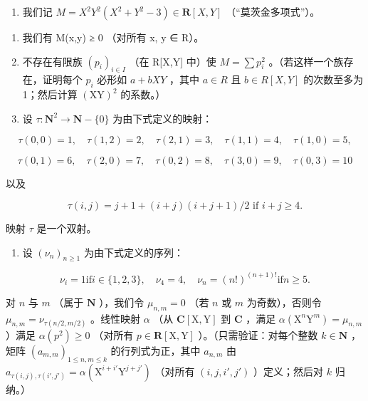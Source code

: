 \begin{enumerate}
\def\labelenumi{\arabic{enumi})}
\setcounter{enumi}{26}
\tightlist
\item
  我们记 \(M = X^{2}Y^{2}(X^{2} + Y^{2} - 3) \in \mathbf{R}[X, Y]\) （“莫茨金多项式”）。
\end{enumerate}

\begin{enumerate}
\def\labelenumi{\alph{enumi})}
\item
  我们有 M(x,y) ≥ 0 （对所有 x, y ∈ R）。
\item
  不存在有限族 \((p_{i})_{i\in I}\) （在 R{[}X,Y{]} 中）使 \(M=\sum p_{i}^{2}\) 。（若这样一个族存在，证明每个 \(p_{i}\) 必形如 \(a+bXY\) ，其中 \(a\in R\) 且 \(b\in R[X,Y]\) 的次数至多为 1；然后计算 \((\mathrm{XY})^{2}\) 的系数。）
\item
  设 \(\tau\colon\mathbf{N}^{2}\to\mathbf{N}-\{0\}\) 为由下式定义的映射：
\end{enumerate}

\[
\tau (0, 0) = 1, \quad \tau (1, 2) = 2, \quad \tau (2, 1) = 3, \quad \tau (1, 1) = 4, \quad \tau (1, 0) = 5,
\]

\[
\tau (0, 1) = 6, \quad \tau (2, 0) = 7, \quad \tau (0, 2) = 8, \quad \tau (3, 0) = 9, \quad \tau (0, 3) = 1 0
\]

以及

\[
\tau (i, j) = j + 1 + (i + j) (i + j + 1) / 2 \text {   if   } i + j \geqslant 4.
\]

映射 \(\tau\) 是一个双射。

\begin{enumerate}
\def\labelenumi{\alph{enumi})}
\setcounter{enumi}{3}
\tightlist
\item
  设 \((\nu_{n})_{n\geqslant 1}\) 为由下式定义的序列：
\end{enumerate}

\[
\nu_ {i} = 1 \text {if} i \in \{1, 2, 3 \}, \quad \nu_ {4} = 4, \quad \nu_ {n} = (n!) ^ {(n + 1)!} \text {if} n \geqslant 5.
\]

对 \(n\) 与 \(m\) （属于 \(\mathbf{N}\) ），我们令 \(\mu_{n,m} = 0\) （若 \(n\) 或 \(m\) 为奇数），否则令 \(\mu_{n,m} = \nu_{\tau(n/2,m/2)}\) 。线性映射 \(\alpha\) （从 \(\mathbf{C}[\mathrm{X},\mathrm{Y}]\) 到 \(\mathbf{C}\) ，满足 \(\alpha(\mathrm{X}^n\mathrm{Y}^m) = \mu_{n,m}\) ）满足 \(\alpha(p^2) \geqslant 0\) （对所有 \(p \in \mathbf{R}[\mathrm{X},\mathrm{Y}]\) ）。（只需验证：对每个整数 \(k \in \mathbf{N}\) ，矩阵 \((a_{m,m})_{1 \leqslant n,m \leqslant k}\) 的行列式为正，其中 \(a_{n,m}\) 由 \(a_{\tau(i,j),\tau(i',j')} = \alpha(\mathrm{X}^{i+i'}\mathrm{Y}^{j+j'})\) （对所有 \((i,j,i',j')\) ）定义；然后对 \(k\) 归纳。）

